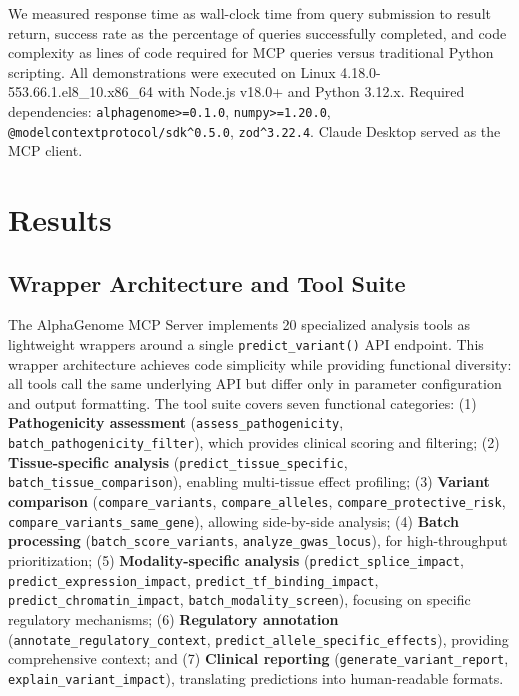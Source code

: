 \documentclass[11pt]{article}
\begin{document}
We measured response time as wall-clock time from query submission to result return, success rate as the percentage of queries successfully completed, and code complexity as lines of code required for MCP queries versus traditional Python scripting. All demonstrations were executed on Linux 4.18.0-553.66.1.el8\_10.x86\_64 with Node.js v18.0+ and Python 3.12.x. Required dependencies: \texttt{alphagenome>=0.1.0}, \texttt{numpy>=1.20.0}, \texttt{@modelcontextprotocol/sdk\^{}0.5.0}, \texttt{zod\^{}3.22.4}. Claude Desktop served as the MCP client.

\section{Results}

\subsection{Wrapper Architecture and Tool Suite}

The AlphaGenome MCP Server implements 20 specialized analysis tools as lightweight wrappers around a single \texttt{predict\_variant()} API endpoint. This wrapper architecture achieves code simplicity while providing functional diversity: all tools call the same underlying API but differ only in parameter configuration and output formatting. The tool suite covers seven functional categories: (1) \textbf{Pathogenicity assessment} (\texttt{assess\_pathogenicity}, \texttt{batch\_pathogenicity\_filter}), which provides clinical scoring and filtering; (2) \textbf{Tissue-specific analysis} (\texttt{predict\_tissue\_specific}, \texttt{batch\_tissue\_comparison}), enabling multi-tissue effect profiling; (3) \textbf{Variant comparison} (\texttt{compare\_variants}, \texttt{compare\_alleles}, \texttt{compare\_protective\_risk}, \texttt{compare\_variants\_same\_gene}), allowing side-by-side analysis; (4) \textbf{Batch processing} (\texttt{batch\_score\_variants}, \texttt{analyze\_gwas\_locus}), for high-throughput prioritization; (5) \textbf{Modality-specific analysis} (\texttt{predict\_splice\_impact}, \texttt{predict\_expression\_impact}, \texttt{predict\_tf\_binding\_impact}, \texttt{predict\_chromatin\_impact}, \texttt{batch\_modality\_screen}), focusing on specific regulatory mechanisms; (6) \textbf{Regulatory annotation} (\texttt{annotate\_regulatory\_context}, \texttt{predict\_allele\_specific\_effects}), providing comprehensive context; and (7) \textbf{Clinical reporting} (\texttt{generate\_variant\_report}, \texttt{explain\_variant\_impact}), translating predictions into human-readable formats.
\end{document}
